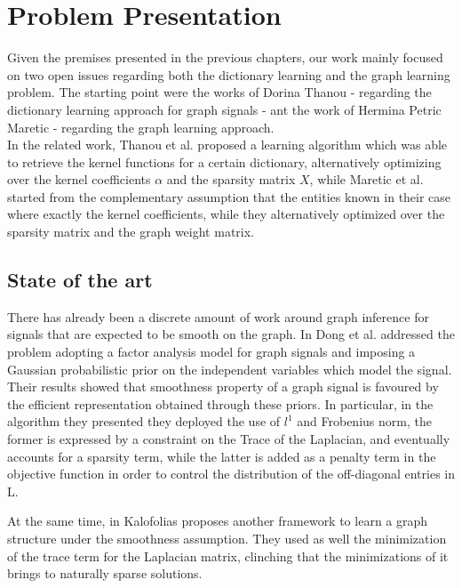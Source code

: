 \chapter{Problem Presentation}
Given the premises presented in the previous chapters, our work mainly focused on two open issues regarding both the dictionary learning and the graph learning problem. The starting point were the works of Dorina Thanou -  regarding the dictionary learning approach for graph signals - ant the work of Hermina Petric Maretic - regarding the graph learning approach.\\
In the related work, Thanou et al. proposed a learning algorithm which was able to retrieve the kernel functions for a certain dictionary, alternatively optimizing over the kernel coefficients $\alpha$ and the sparsity matrix $X$, while Maretic et al. started from the complementary assumption that the entities known in their case where exactly the kernel coefficients, while they alternatively optimized over the sparsity matrix and the graph weight matrix.

\section{State of the art}
There has already been a discrete amount of work around graph inference for signals that are expected to be smooth on the graph.  In \cite{Dong2016} Dong et al. addressed the problem adopting a factor analysis model for graph signals and imposing a Gaussian probabilistic prior on the independent variables which model the signal. Their results showed that smoothness property of a graph signal is favoured by the efficient representation obtained through these priors. In particular, in the algorithm they presented they deployed the use of $l^1$ and Frobenius norm, the former is expressed by a constraint on the Trace of the Laplacian, and eventually accounts for a sparsity term, while the latter is added as a penalty term in the objective function in order to control the distribution of the off-diagonal entries in L.

At the same time, in \cite{Kalofolias2016} Kalofolias proposes another framework to learn a graph structure under the smoothness assumption. They used as well the minimization of the trace term for the Laplacian matrix, clinching that the minimizations of it brings to naturally sparse solutions.

